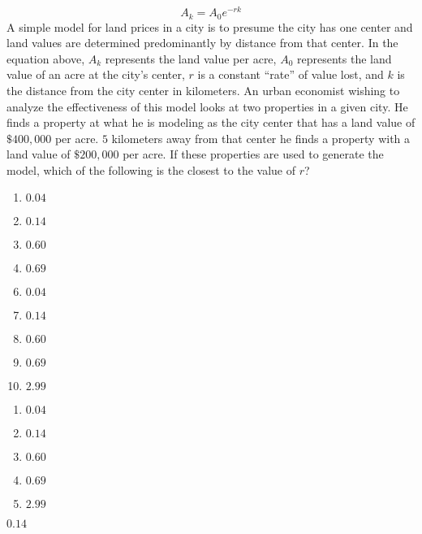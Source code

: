  
$$A_k=A_0e^{-rk}$$
A simple model for land prices in a city is to presume the city has one center and land values are determined predominantly by distance from that center.  In the equation above, $A_k$ represents the land value per acre, $A_0$ represents the land value of an acre at the city's center, $r$ is a constant ``rate'' of value lost, and $k$ is the distance from the city center in kilometers.  An urban economist wishing to analyze the effectiveness of this model looks at two properties in a given city.  He finds a property at what he is modeling as the city center that has a land value of $\$400,000$ per acre.  $5$ kilometers away from that center he finds a property with a land value of $\$200,000$ per acre.  If these properties are used to generate the model, which of the following is the closest to the value of $r$?


\ifsat
	\begin{enumerate}[label=\Alph*)]
		\item $0.04 $ 
		\item $0.14 $ %
		\item $0.60 $ 
		\item $0.69 $
	\end{enumerate}
\else
\fi

\ifacteven
	\begin{enumerate}[label=\textbf{\Alph*.},itemsep=\fill,align=left]
		\setcounter{enumii}{5}
		\item $0.04 $ 
		\item $0.14 $ %
		\item $0.60 $ 
		\addtocounter{enumii}{1}
		\item $0.69 $
		\item $2.99 $
	\end{enumerate}
\else
\fi

\ifactodd
	\begin{enumerate}[label=\textbf{\Alph*.},itemsep=\fill,align=left]
		\item $0.04 $ 
		\item $0.14 $ %
		\item $0.60 $ 
		\item $0.69 $
		\item $2.99 $
	\end{enumerate}
\else
\fi

\ifgridin
 $0.14 $ %
		
\else
\fi

